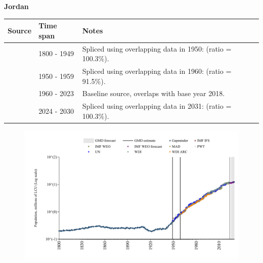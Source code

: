 \documentclass[12pt,a4paper,landscape]{article}
\begin{document}
\begin{adjustbox}{max totalsize={\paperwidth}{\paperheight},center}
\begin{minipage}[t][\textheight][t]{\textwidth}
\vspace*{0.5cm}
{}
\begin{center}
{\Large\bfseries Jordan}
\end{center}
\vspace{0.5cm}
\begin{table}[H]
\centering
\small
\begin{tabular}{|l|l|l|}
\hline
\textbf{Source} & \textbf{Time span} & \textbf{Notes} \\
\hline
\rowcolor{white}\cite{Gapminder}& 1800 - 1949 &Spliced using overlapping data in 1950: (ratio = 100.3\%).\\
\rowcolor{lightgray}\cite{IMF_IFS}& 1950 - 1959 &Spliced using overlapping data in 1960: (ratio = 91.5\%).\\
\rowcolor{white}\cite{WDI}& 1960 - 2023 &Baseline source, overlaps with base year 2018.\\
\rowcolor{lightgray}\cite{Gapminder}& 2024 - 2030 &Spliced using overlapping data in 2031: (ratio = 100.3\%).\\
\hline
\end{tabular}
\end{table}
\begin{figure}[H]
\centering
\includegraphics[width=\textwidth,height=0.6\textheight,keepaspectratio]{graphs/JOR_pop.pdf}
\end{figure}
\end{minipage}
\end{adjustbox}
\end{document}
